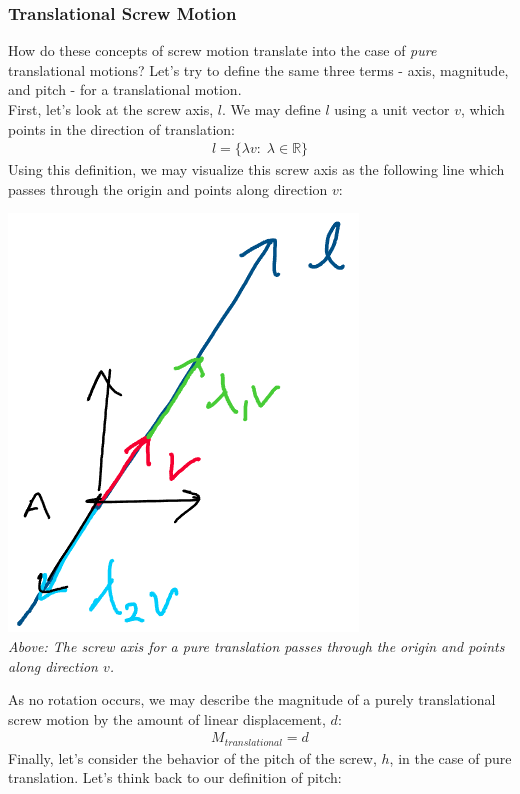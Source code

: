\documentclass[oneside]{book}
\begin{document}
\subsubsection{Translational Screw Motion}
How do these concepts of screw motion translate into the case of \textit{pure} translational motions? Let's try to define the same three terms - axis, magnitude, and pitch - for a translational motion.\\
First, let's look at the screw axis, $l$. We may define $l$ using a unit vector $v$, which points in the direction of translation:
\begin{align}
    l = \{\lambda v: \; \lambda \in \mathbb{R} \}
\end{align}
Using this definition, we may visualize this screw axis as the following line which passes through the origin and points along direction $v$:
\begin{center}
    \includegraphics[scale=0.3]{images/translationalCase.png}\\
    \textit{Above: The screw axis for a pure translation passes through the origin and points along direction $v$.}
\end{center}
As no rotation occurs, we may describe the magnitude of a purely translational screw motion by the amount of linear displacement, $d$:
\begin{align}
    M_{translational} = d
\end{align}
Finally, let's consider the behavior of the pitch of the screw, $h$, in the case of pure translation. Let's think back to our definition of pitch:
\end{document}
